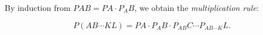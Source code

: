 By induction from $PAB = PA \cdot P_A B$, we obtain the \textit{multiplication rule}:

$$P(AB \cdots KL) = PA \cdot P_A B \cdot P_{AB} C \cdots P_{AB \cdots K} L.$$
